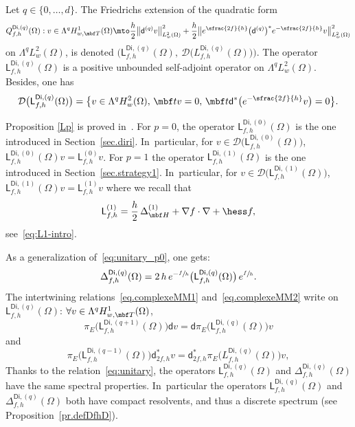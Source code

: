 \begin{proposition} \label{Lp}
Let $q\in \{0,\ldots,d\}$.
The Friedrichs extension of the quadratic form
\[
Q_{f,h}^{\mathsf{Di},(q)}(\Omega): v \in \Lambda^q H^1_{w,\mbf T}(\Omega)\mto \frac{h}{2}
\big\Vert \mathsf d^{(q)}v\big \Vert_{ L^2_w(\Omega)}^2
+\frac{h}{2}\big \Vert
e^{\sfrac{2f}{h}} \bigl(\mathsf d^{(q)}\bigr)^* e^{-\sfrac{2f}{h}} v\big \Vert_{ L^2_w(\Omega)}^2
\]
on $\Lambda^qL^2_w(\Omega)$, is denoted
$\bigl(\mathsf L^{\mathsf{Di},(q)}_{f,h}(\Omega), \ \mathcal
D\bigl(L^{\mathsf{Di},(q)}_{f,h}(\Omega)\bigr)\bigr)$. The operator $\mathsf L^{\mathsf{Di},(q)}_{f,h}(\Omega)$ is a positive unbounded self-adjoint operator on $\Lambda^qL^2_w(\Omega)$. Besides, one has
\[
\mathcal D\bigl(\mathsf L^{\mathsf{Di},(q)}_{f,h}(\Omega)\bigr)=\big\{ v \in \Lambda^qH^2_w(\Omega),\, \mbf tv=0, \, \mbf t \mathsf d^*\bigl(e^{-\sfrac{2f}{h}}v\bigr)=0 \big\}.
\]
\end{proposition}

Proposition \ref{Lp} is proved in~\cite[\S2.4]{helffer-nier-06}.
For $p=0$, the operator $\mathsf L^{\mathsf{Di},(0)}_{f,h}(\Omega)$
is the one introduced in Section~\ref{sec.diri}. In~particular,
for $v\in \mathcal D\bigl(\mathsf L^{\mathsf{Di},(0)}_{f,h}(\Omega)\bigr)$,
$\mathsf L_{f,h}^{\mathsf{Di}, (0)}(\Omega)v = \mathsf L_{f,h}^{ (0)}v$.
For $p=1$ the operator $\mathsf L^{\mathsf{Di},(1)}_{f,h}(\Omega)$ is the one introduced in Section~\ref{sec.strategy1}. In~particular,
for $v\in \mathcal D\bigl(\mathsf L^{\mathsf{Di},(1)}_{f,h}(\Omega)\bigr)$,
$\mathsf L_{f,h}^{\mathsf{Di}, (1)} (\Omega)v = \mathsf L_{f,h}^{(1)} v$
where we recall that
\[
\mathsf L_{f,h}^{(1)} = \frac{h}{2}\,
\Delta^{(1)}_{\mbf H} + \nabla f \cdot \nabla + \hess f,
\]
see~\eqref{eq:L1-intro}.

As a generalization of~\eqref{eq:unitary_p0}, one gets:
\begin{equation}\label{eq:unitary}
\Delta^{\mathsf{Di},(q)}_{f,h}(\Omega) = 2\, h \, e^{-\sfrac{f}{h}} \bigl(\mathsf L^{\mathsf{Di},(q)}_{f,h}(\Omega) \bigr)\, e^{\sfrac{f}{h}}.
\end{equation}
The intertwining relations~\eqref{eq.complexeMM1} and~\eqref{eq.complexeMM2}
write on $\mathsf L_{f,h}^{\mathsf{Di},(q)}(\Omega)$: $\forall v\in \Lambda^q H^1_{w,\mbf T}(\Omega)$,
\begin{equation}\label{commutationL}
\pi_{E}\bigl(\mathsf L_{f,h}^{\mathsf{Di},(q+1)}(\Omega))\mathsf dv =\mathsf d \pi_{E}\bigl(\mathsf L_{f,h}^{\mathsf{Di},(q)}(\Omega))v
\end{equation}
and
\begin{equation}\label{commutationL2}
\pi_{E}\bigl(\mathsf L_{f,h}^{\mathsf{Di},(q-1)}(\Omega) \bigr)\mathsf d_{2f,h}^{*} v= \mathsf d^{*}_{2f,h} \pi_{E}\bigl(L_{f,h}^{\mathsf{Di},(q)}(\Omega)\bigr)v,
\end{equation}
Thanks to the relation~\eqref{eq:unitary}, the operators
$\mathsf L_{f,h}^{\mathsf{Di},(q)}(\Omega)$ and $\Delta^{\mathsf{Di},(q)}_{f,h}(\Omega)$ have the
same spectral properties. In~particular the operators
$\mathsf L_{f,h}^{\mathsf{Di},(q)}(\Omega)$ and $\Delta^{\mathsf{Di},(q)}_{f,h}(\Omega)$ both have
compact resolvents, and thus a discrete spectrum (see Proposition~\ref{pr.defDfhD}).

